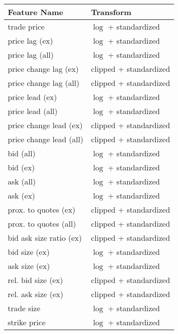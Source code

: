 \begin{table}[H]
    \centering
    \begin{threeparttable}
        \begin{tabular}{@{}ll@{}}
            \toprule
            Feature Name            & Transform              \\ \midrule
            trade price             & $\log$ + standardized  \\
            price lag (ex)          & $\log$ + standardized  \\
            price lag (all)         & $\log$ + standardized  \\
            price change lag (ex)   & clipped + standardized \\
            price change lag (all)  & clipped + standardized \\
            price lead (ex)         & $\log$ + standardized  \\
            price lead (all)        & $\log$ + standardized  \\
            price change lead (ex)  & clipped + standardized \\
            price change lead (all) & clipped + standardized \\
            bid (all)               & $\log$ + standardized  \\
            bid (ex)                & $\log$ + standardized  \\
            ask (all)               & $\log$ + standardized  \\
            ask (ex)                & $\log$ + standardized  \\
            prox. to quotes (ex)    & clipped + standardized \\
            prox. to quotes (all)   & clipped + standardized \\
            bid ask size ratio (ex) & clipped + standardized \\
            bid size (ex)           & $\log$ + standardized  \\
            ask size (ex)           & $\log$ + standardized  \\
            rel. bid size (ex)      & clipped + standardized \\
            rel. ask size (ex)      & clipped + standardized \\
            trade size              & $\log$ + standardized  \\
            strike price            & $\log$ + standardized  \\

\end{tabular}
\end{threeparttable}
\end{table}
